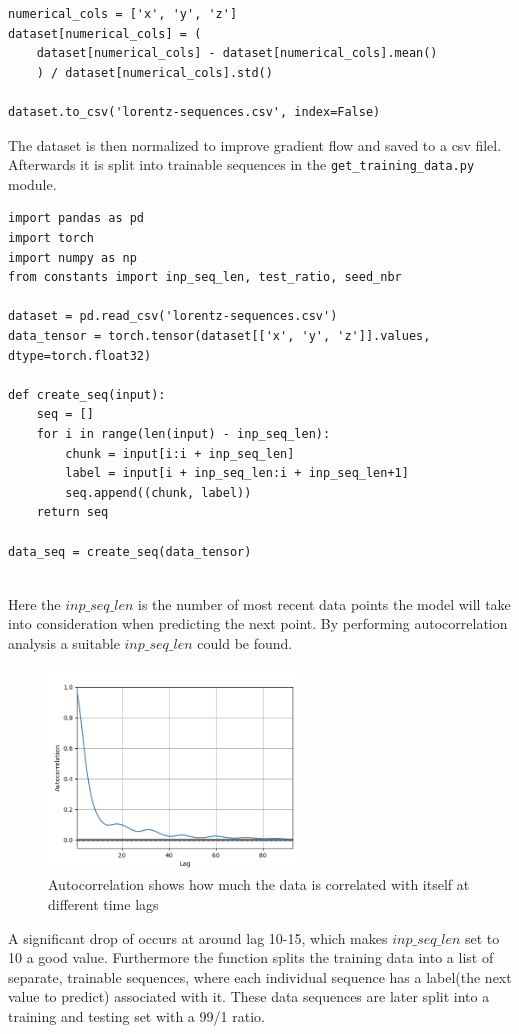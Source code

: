 \documentclass[11pt]{article}
\begin{document}
\begin{lstlisting}
numerical_cols = ['x', 'y', 'z']
dataset[numerical_cols] = (
    dataset[numerical_cols] - dataset[numerical_cols].mean()
    ) / dataset[numerical_cols].std()

dataset.to_csv('lorentz-sequences.csv', index=False)
\end{lstlisting}

The dataset is then normalized to improve gradient flow and saved to a csv filel. Afterwards it is split into trainable sequences in the \texttt{get\_training\_data.py} module.
\begin{lstlisting}
import pandas as pd
import torch
import numpy as np
from constants import inp_seq_len, test_ratio, seed_nbr

dataset = pd.read_csv('lorentz-sequences.csv')
data_tensor = torch.tensor(dataset[['x', 'y', 'z']].values, dtype=torch.float32)

def create_seq(input):
    seq = []
    for i in range(len(input) - inp_seq_len):
        chunk = input[i:i + inp_seq_len]
        label = input[i + inp_seq_len:i + inp_seq_len+1]
        seq.append((chunk, label))
    return seq

data_seq = create_seq(data_tensor)
    
\end{lstlisting}

Here the $inp\_seq\_len$ is the number of most recent data points the model will take into consideration when predicting the next point. By performing autocorrelation analysis a suitable $inp\_seq\_len$ could be found.
\begin{figure}[h]
\centering
\includegraphics[width=0.6\textwidth]{auto_correlation.png}
\caption{Autocorrelation shows how much the data is correlated with itself at different time lags}
\end{figure}

A significant drop of occurs at around lag 10-15, which  makes $inp\_seq\_len$ set to 10 a good value. Furthermore the function splits the training data into a list of separate, trainable sequences, where each individual sequence has a label(the next value to predict) associated with it. These data sequences are later split into a training and testing set with a 99/1 ratio. 
\end{document}
